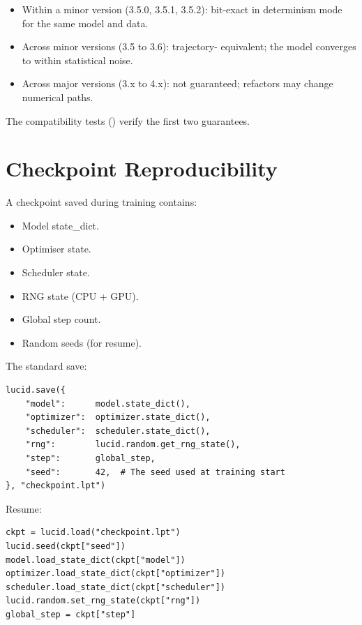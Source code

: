 \begin{itemize}
  \item Within a minor version (3.5.0, 3.5.1, 3.5.2):
    bit-exact in determinism mode for the same model and data.
  \item Across minor versions (3.5 to 3.6): trajectory-
    equivalent; the model converges to within statistical
    noise.
  \item Across major versions (3.x to 4.x): not guaranteed;
    refactors may change numerical paths.
\end{itemize}

The compatibility tests ()
verify the first two guarantees.

\section{Checkpoint Reproducibility}
\label{sec:reproducibility:checkpoint}

A checkpoint saved during training contains:
\begin{itemize}
  \item Model state\_dict.
  \item Optimiser state.
  \item Scheduler state.
  \item RNG state (CPU + GPU).
  \item Global step count.
  \item Random seeds (for resume).
\end{itemize}

The standard save:

\begin{lstlisting}[style=lucid,language=LucidPython]
lucid.save({
    "model":      model.state_dict(),
    "optimizer":  optimizer.state_dict(),
    "scheduler":  scheduler.state_dict(),
    "rng":        lucid.random.get_rng_state(),
    "step":       global_step,
    "seed":       42,  # The seed used at training start
}, "checkpoint.lpt")
\end{lstlisting}

Resume:

\begin{lstlisting}[style=lucid,language=LucidPython]
ckpt = lucid.load("checkpoint.lpt")
lucid.seed(ckpt["seed"])
model.load_state_dict(ckpt["model"])
optimizer.load_state_dict(ckpt["optimizer"])
scheduler.load_state_dict(ckpt["scheduler"])
lucid.random.set_rng_state(ckpt["rng"])
global_step = ckpt["step"]
\end{lstlisting}

